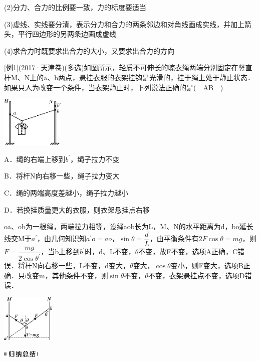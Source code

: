 (2)分力、合力的比例要一致，力的标度要适当

(3)虚线、实线要分清，表示分力和合力的两条邻边和对角线画成实线，并加上箭头，平行四边形的另两条边画成虚线

(4)求合力时既要求出合力的大小，又要求出合力的方向

{[}例1{]}(2017·天津卷)(多选)如图所示，轻质不可伸长的晾衣绳两端分别固定在竖直杆M、N上的a、b两点，悬挂衣服的衣架挂钩是光滑的，挂于绳上处于静止状态．如果只人为改变一个条件，当衣架静止时，下列说法正确的是(　AB　)

\begin{center}\includegraphics[width=1.17708in,height=0.94792in]{media/image68.png}\end{center}

A．绳的右端上移到$b^{'}$，绳子拉力不变

B．将杆N向右移一些，绳子拉力变大

C．绳的两端高度差越小，绳子拉力越小

D．若换挂质量更大的衣服，则衣架悬挂点右移
\begin{solution}
	oa、ob为一根绳，两端拉力相等，设绳aob长为L，M、N的水平距离为d，bo延长线交M于$a^{'}$，由几何知识知$a^{'}o=ao$，$\sin\theta=\dfrac{d}{L}$，由平衡条件有$2F\cos\theta=mg$，则$F=\dfrac{mg}{2\cos\theta^{'}}$，当b上移到$b^{'}$时，d、L不变，$\theta$不变，故F不变，选项A正确，C错误．将杆N向右移一些，L不变，d变大，$\theta$变大，$\cos\theta$变小，则F变大，选项B正确．只改变m，其他条件不变，则$\sin\theta$不变，$\theta$不变，衣架悬挂点不变，选项D错误．
\end{solution}


\begin{center}\includegraphics[width=1in,height=0.88542in]{media/image69.png}\end{center}
\begin{center}\includegraphics[width=0.70833in,height=0.125in]{media/image13.png}\end{center}

